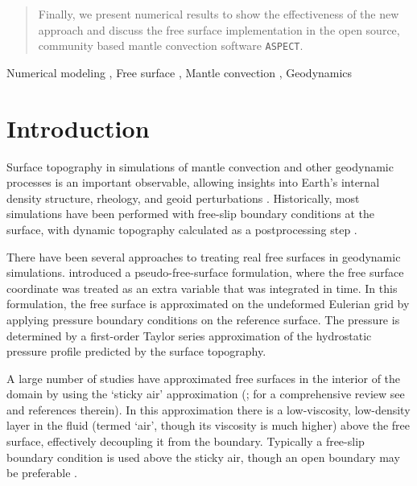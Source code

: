 \documentclass[preprint,12pt,authoryear]{elsarticle}
\begin{document}
\begin{frontmatter}
\begin{abstract}
Finally, we present numerical results to show the effectiveness of the new approach and discuss the free surface implementation in the open source, community based
mantle convection software \texttt{ASPECT}.
\end{abstract}

\begin{keyword}
Numerical modeling \sep
Free surface \sep
Mantle convection \sep
Geodynamics



\end{keyword}

\end{frontmatter}

\linenumbers

\section{Introduction}
\label{sec:intro}

Surface topography in simulations of mantle convection and other geodynamic processes is an important observable,
allowing insights into Earth's internal density structure, rheology, and geoid perturbations \citep[e.g.][]{richards1984geoid, hager1985lower, baumann2014constraining}.
Historically, most simulations have been performed with free-slip boundary conditions at the surface, 
with dynamic topography calculated as a postprocessing step \citep[e.g.][]{jarvis1982mantle, zhong2000role}.

There have been several approaches to treating real free surfaces in geodynamic simulations.
\citet{zhong1996free} introduced a pseudo-free-surface formulation, where the free surface coordinate was
treated as an extra variable that was integrated in time. In this formulation, the free surface 
is approximated on the undeformed Eulerian grid by applying pressure boundary conditions on the reference surface.
The pressure is determined by a first-order Taylor series approximation of the hydrostatic pressure profile 
predicted by the surface topography.

A large number of studies have approximated free surfaces in the interior of the domain by using the 
`sticky air' approximation (\citet{matsumoto1983numerical}; for a comprehensive review see \citet{crameri2012comparison} and references therein). In this approximation there is a low-viscosity, low-density layer in the fluid 
(termed `air', though its viscosity is much higher) above the free surface, effectively decoupling it from the boundary. 
Typically a free-slip boundary condition is used above the sticky air, though an open boundary may be preferable \citep{hillebrand2014using}. 
\end{document}
